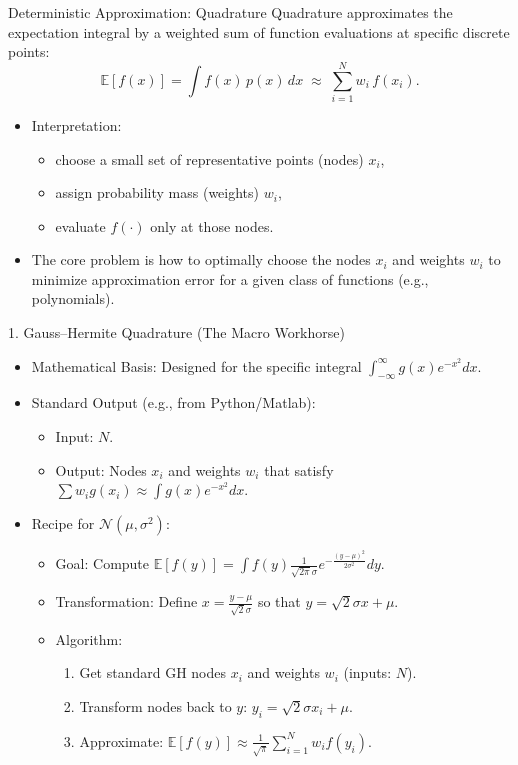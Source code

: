 \documentclass[aspectratio=169]{beamer}
\newcommand{\1}{\mathbf{1}}
\begin{document}
\begin{frame}{Deterministic Approximation: Quadrature}
\small
Quadrature approximates the expectation integral by a weighted sum of function evaluations at specific discrete points:
\[
    \mathbb{E}[f(x)] = \int f(x)\,p(x)\,dx \;\approx\; \sum_{i=1}^{N} w_i\, f(x_i).
\]
\begin{itemize}\setlength{\itemsep}{1.5mm}
    \item Interpretation:
    \begin{itemize}\setlength{\itemsep}{1mm}
        \item choose a small set of representative points (nodes) $x_i$,
        \item assign probability mass (weights) $w_i$,
        \item evaluate $f(\cdot)$ only at those nodes.
    \end{itemize}
    \item The core problem is how to optimally choose the nodes $x_i$ and weights $w_i$ to minimize approximation error for a given class of functions (e.g., polynomials).
\end{itemize}
\end{frame}

\begin{frame}{1. Gauss--Hermite Quadrature (The Macro Workhorse)}
\small
\begin{itemize}\setlength{\itemsep}{1.5mm}
    \item Mathematical Basis: Designed for the specific integral $\int_{-\infty}^{\infty} g(x) e^{-x^2} dx$.
    \item Standard Output (e.g., from Python/Matlab):
    \begin{itemize}\setlength{\itemsep}{1mm}
        \item Input: $N$.
        \item Output: Nodes $x_i$ and weights $w_i$ that satisfy $\sum w_i g(x_i) \approx \int g(x)e^{-x^2}dx$.
    \end{itemize}
    \item Recipe for $\mathcal{N}(\mu, \sigma^2)$:
    \begin{itemize}\setlength{\itemsep}{1mm}
        \item Goal: Compute $\mathbb{E}[f(y)] = \int f(y) \frac{1}{\sqrt{2\pi}\sigma} e^{-\frac{(y-\mu)^2}{2\sigma^2}} dy$.
        \item Transformation: Define $x = \frac{y-\mu}{\sqrt{2}\sigma}$ so that $y = \sqrt{2}\sigma x + \mu$.
        \item Algorithm:
        \begin{enumerate}
            \item Get standard GH nodes $x_i$ and weights $w_i$ (inputs: $N$).
            \item Transform nodes back to $y$: $y_i = \sqrt{2}\sigma x_i + \mu$.
            \item Approximate: $\mathbb{E}[f(y)] \approx \frac{1}{\sqrt{\pi}} \sum_{i=1}^N w_i f(y_i)$.
        \end{enumerate}
    \end{itemize}
\end{itemize}
\end{frame}
\end{document}
